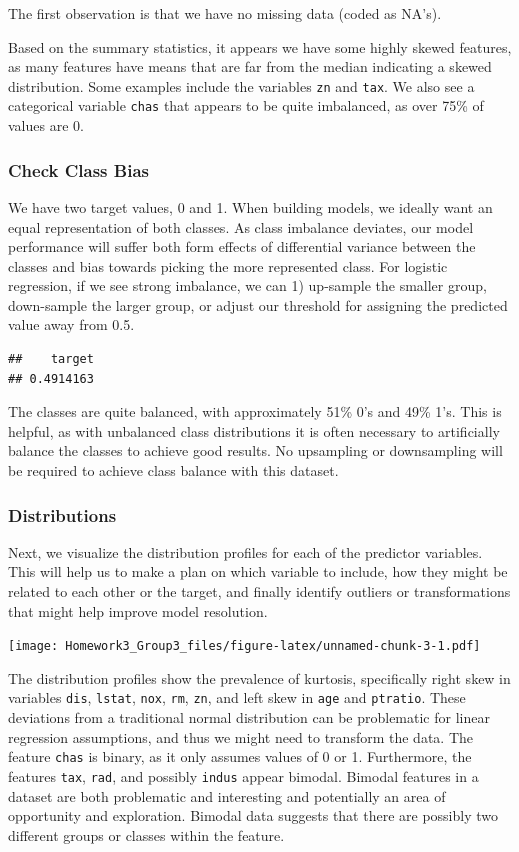 \documentclass[
]{article}
\begin{document}
The first observation is that we have no missing data (coded as NA's).

Based on the summary statistics, it appears we have some highly skewed
features, as many features have means that are far from the median
indicating a skewed distribution. Some examples include the variables
\texttt{zn} and \texttt{tax}. We also see a categorical variable
\texttt{chas} that appears to be quite imbalanced, as over 75\% of
values are 0.

\hypertarget{check-class-bias}{%
\subsubsection{Check Class Bias}\label{check-class-bias}}

We have two target values, 0 and 1. When building models, we ideally
want an equal representation of both classes. As class imbalance
deviates, our model performance will suffer both form effects of
differential variance between the classes and bias towards picking the
more represented class. For logistic regression, if we see strong
imbalance, we can 1) up-sample the smaller group, down-sample the larger
group, or adjust our threshold for assigning the predicted value away
from 0.5.

\begin{verbatim}
##    target 
## 0.4914163
\end{verbatim}

The classes are quite balanced, with approximately 51\% 0's and 49\%
1's. This is helpful, as with unbalanced class distributions it is often
necessary to artificially balance the classes to achieve good results.
No upsampling or downsampling will be required to achieve class balance
with this dataset.

\hypertarget{distributions}{%
\subsubsection{Distributions}\label{distributions}}

Next, we visualize the distribution profiles for each of the predictor
variables. This will help us to make a plan on which variable to
include, how they might be related to each other or the target, and
finally identify outliers or transformations that might help improve
model resolution.

\texttt{[image: Homework3\_Group3\_files/figure-latex/unnamed-chunk-3-1.pdf]}

The distribution profiles show the prevalence of kurtosis, specifically
right skew in variables \texttt{dis}, \texttt{lstat}, \texttt{nox},
\texttt{rm}, \texttt{zn}, and left skew in \texttt{age} and
\texttt{ptratio}. These deviations from a traditional normal
distribution can be problematic for linear regression assumptions, and
thus we might need to transform the data. The feature \texttt{chas} is
binary, as it only assumes values of 0 or 1. Furthermore, the features
\texttt{tax}, \texttt{rad}, and possibly \texttt{indus} appear bimodal.
Bimodal features in a dataset are both problematic and interesting and
potentially an area of opportunity and exploration. Bimodal data
suggests that there are possibly two different groups or classes within
the feature.
\end{document}
